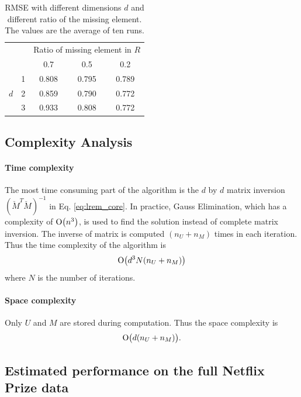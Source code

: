 \documentclass{article}
\begin{document}
\begin{table}[h]
 \caption{RMSE with different dimensions $d$ and different ratio of the missing element. The values are the average of ten runs.}
 \label{table:lrem_result}
 \begin{center}
  \begin{tabular}{|c|c||c|c|c|}
    \hline
    \multicolumn{2}{|c|}{}  & \multicolumn{3}{|c|}{Ratio of missing element in $R$} \\
    \cline{3-5}
     \multicolumn{2}{|c|}{}    &  0.7  &  0.5  & 0.2   \\
    \hline
    \hline
       & 1 &  0.808  &  0.795  &  0.789  \\
    \cline{2-5}
     $d$ & 2 &  0.859  &  0.790  & 0.772   \\
    \cline{2-5}
     & 3 &  0.933  &  0.808  &  0.772  \\
    \hline
  \end{tabular}
 \end{center}
\end{table}

\subsection{Complexity Analysis}
\paragraph{Time complexity} 
The most time consuming part of the algorithm is the $d$ by $d$ matrix inversion $(\check{M}^T\check{M})^{-1}$ in Eq. \ref{eq:lrem_core}. In practice, Gauss Elimination, which has a complexity of $\operatorname{O}\bigl(n^3\bigr)$, is used to find the solution instead of complete matrix inversion. The inverse of matrix is computed $(n_U+n_M)$ times in each iteration. Thus the time complexity of the algorithm is 
\begin{equation}
\operatorname{O}\bigl(d^3N(n_U+n_M)\bigr)
\end{equation}
where $N$ is the number of iterations.

\paragraph{Space complexity}
Only $U$ and $M$ are stored during computation. Thus the space complexity is
\begin{equation}
\operatorname{O}\bigl(d(n_U+n_M)\bigr).
\end{equation}

\subsection{Estimated performance on the full Netflix Prize data}
\end{document}
